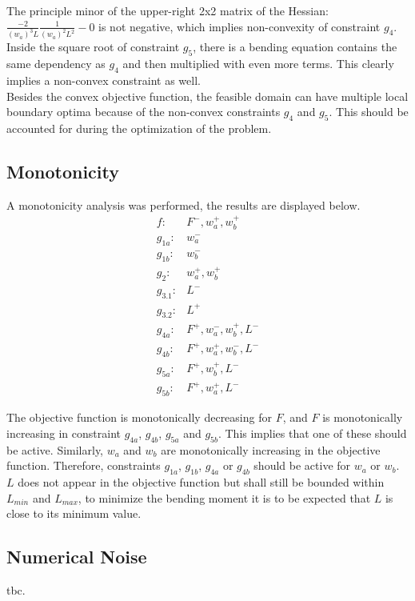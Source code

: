 The principle minor of the upper-right 2x2 matrix of the Hessian: $\frac{-2}{\left( w_a \right)^3 L } \frac{1}{\left( w_a \right)^2 L^2 } - 0 $ is not negative, which implies non-convexity of constraint $g_4$.\\

Inside the square root of constraint $g_5$, there is a bending equation contains the same dependency as $g_4$ and then multiplied with even more terms. This clearly implies a non-convex constraint as well. \\
Besides the convex objective function, the feasible domain can have multiple local boundary optima because of the non-convex constraints $g_4$ and $g_5$. This should be accounted for during the optimization of the problem.

\subsection{Monotonicity}
A monotonicity analysis was performed, the results are displayed below. 
\begin{align*}
	f: & F^-, w_a^+, w_b^+ \\
	g_{1a}:& w_a^- \\
	g_{1b}:& w_b^- \\
	g_{2}:& w_a^+, w_b^+\\
	g_{3.1}:& L^- \\
	g_{3.2}:& L^+ \\
	g_{4a}:& F^+, w_a^-, w_b^+, L^- \\
	g_{4b}:& F^+, w_a^+, w_b^-, L^-\\
	g_{5a}:& F^+, w_b^+, L^-\\
	g_{5b}:& F^+, w_a^+, L^-
\end{align*}

The objective function is monotonically decreasing for $F$, and $F$ is monotonically increasing in constraint $g_{4a}$, $g_{4b}$, $g_{5a}$ and $g_{5b}$. This implies that one of these should be active. Similarly, $w_a$ and $w_b$ are monotonically increasing in the objective function. Therefore, constraints $g_{1a}$, $g_{1b}$, $g_{4a}$ or $g_{4b}$ should be active for $w_a$ or $w_b$. $L$ does not appear in the objective function but shall still be bounded within $L_{min}$ and $L_{max}$, to minimize the bending moment it is to be expected that $L$ is close to its minimum value. 

\subsection{Numerical Noise}
tbc.



